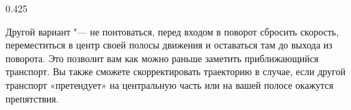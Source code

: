 \begin{langblock}{0.425}
\begin{rus}
		Другой вариант "--- не понтоваться, перед входом в поворот сбросить скорость, переместиться в центр своей полосы движения и оставаться там до выхода из поворота. Это позволит вам как можно раньше заметить приближающийся транспорт. Вы также сможете скорректировать траекторию в случае, если другой транспорт «претендует» на центральную часть или на вашей полосе окажутся препятствия.
\end{rus}
\end{langblock}













